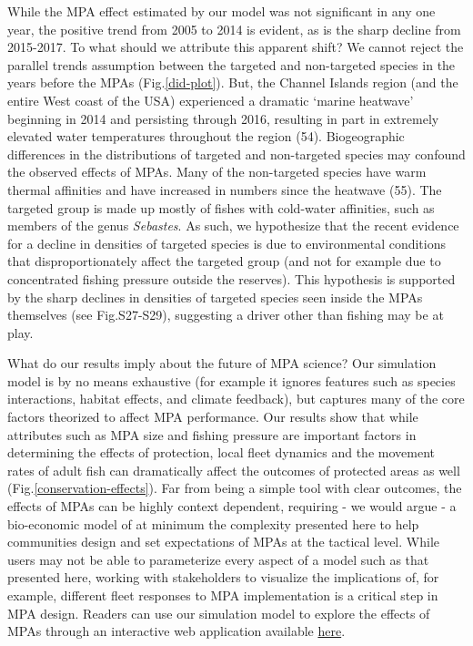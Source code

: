 \documentclass[9pt,twocolumn,twoside,lineno]{pnas-new}
\begin{document}
While the MPA effect estimated by our model was not significant in any
one year, the positive trend from 2005 to 2014 is evident, as is the
sharp decline from 2015-2017. To what should we attribute this apparent
shift? We cannot reject the parallel trends assumption between the
targeted and non-targeted species in the years before the MPAs
(Fig.\ref{did-plot}). But, the Channel Islands region (and the entire
West coast of the USA) experienced a dramatic `marine heatwave'
beginning in 2014 and persisting through 2016, resulting in part in
extremely elevated water temperatures throughout the region (54).
Biogeographic differences in the distributions of targeted and
non-targeted species may confound the observed effects of MPAs. Many of
the non-targeted species have warm thermal affinities and have increased
in numbers since the heatwave (55). The targeted group is made up mostly
of fishes with cold-water affinities, such as members of the genus
\emph{Sebastes}. As such, we hypothesize that the recent evidence for a
decline in densities of targeted species is due to environmental
conditions that disproportionately affect the targeted group (and not
for example due to concentrated fishing pressure outside the reserves).
This hypothesis is supported by the sharp declines in densities of
targeted species seen inside the MPAs themselves (see Fig.S27-S29),
suggesting a driver other than fishing may be at play.

What do our results imply about the future of MPA science? Our
simulation model is by no means exhaustive (for example it ignores
features such as species interactions, habitat effects, and climate
feedback), but captures many of the core factors theorized to affect MPA
performance. Our results show that while attributes such as MPA size and
fishing pressure are important factors in determining the effects of
protection, local fleet dynamics and the movement rates of adult fish
can dramatically affect the outcomes of protected areas as well
(Fig.\ref{conservation-effects}). Far from being a simple tool with
clear outcomes, the effects of MPAs can be highly context dependent,
requiring - we would argue - a bio-economic model of at minimum the
complexity presented here to help communities design and set
expectations of MPAs at the tactical level. While users may not be able
to parameterize every aspect of a model such as that presented here,
working with stakeholders to visualize the implications of, for example,
different fleet responses to MPA implementation is a critical step in
MPA design. Readers can use our simulation model to explore the effects
of MPAs through an interactive web application available
\href{https://danovando.shinyapps.io/simmpa/}{here}.
\end{document}

